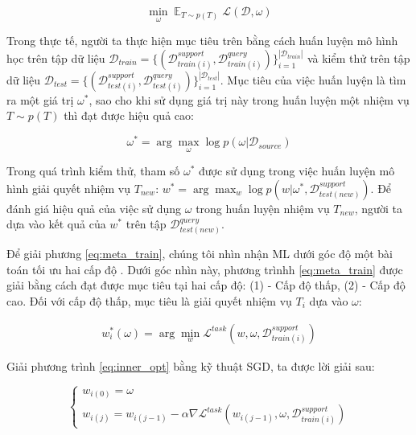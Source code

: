 \begin{equation}
    \min_{\omega} \mathop{\mathbb{E}}_{T\sim p(T)} \mathcal{L}(\mathcal{D}, \omega)
\end{equation}

Trong thực tế, người ta thực hiện mục tiêu trên bằng cách huấn luyện mô hình học trên tập dữ liệu $\mathcal{D}_{train} = \{(\mathcal{D}_{train(i)}^{support}, \mathcal{D}_{train(i)}^{query})\}_{i=1}^{|\mathcal{D}_{train}|}$ và kiểm thử trên tập dữ liệu $\mathcal{D}_{test} = \{(\mathcal{D}_{test(i)}^{support}, \mathcal{D}_{test(i)}^{query})\}_{i=1}^{|\mathcal{D}_{test}|}$. Mục tiêu của việc huấn luyện là tìm ra một giá trị $\omega^*$, sao cho khi sử dụng giá trị này trong huấn luyện một nhiệm vụ $T\sim p(T)$ thì đạt được hiệu quả cao:

\begin{dmath}
    \label{eq:meta_train}
    \omega^* = \arg \max_{\omega} \log{p(\omega|\mathcal{D}_{source})}
\end{dmath}

Trong quá trình kiểm thử, tham số $\omega^*$ được sử dụng trong việc huấn luyện mô hình giải quyết nhiệm vụ $T_{new}$: $w^* = \arg \max_{w} \log{p(w|\omega^*, \mathcal{D}_{test(new)}^{support})}$. Để đánh giá hiệu quả của việc sử dụng $\omega$ trong huấn luyện nhiệm vụ $T_{new}$, người ta dựa vào kết quả của $w^*$ trên tập $\mathcal{D}_{test(new)}^{query}$.

Để giải phương \ref{eq:meta_train}, chúng tôi nhìn nhận ML dưới góc độ một bài toán tối ưu hai cấp độ \cite{hospedales2020meta}. Dưới góc nhìn này, phương trìnhh \ref{eq:meta_train} được giải bằng cách đạt được mục tiêu tại hai cấp độ: (1) - Cấp độ thấp, (2) - Cấp độ cao. Đối với cấp độ thấp, mục tiêu là giải quyết nhiệm vụ $T_i$ dựa vào $\omega$:

\begin{eqnarray}
    \label{eq:inner_opt}
    w^*_i(\omega) = \arg \min_{w} \mathcal{L}^{task}(w, \omega, \mathcal{D}_{train(i)}^{support})
\end{eqnarray}

Giải phương trình \ref{eq:inner_opt} bằng kỹ thuật SGD, ta được lời giải sau:

\begin{equation}
    \label{sol:inner_opt}
    \begin{cases}
        w_{i(0)} = \omega\\
        w_{i(j)} = w_{i(j-1)} - \alpha \nabla \mathcal{L}^{task}(w_{i(j-1)}, \omega, \mathcal{D}_{train(i)}^{support})
    \end{cases}
\end{equation}

